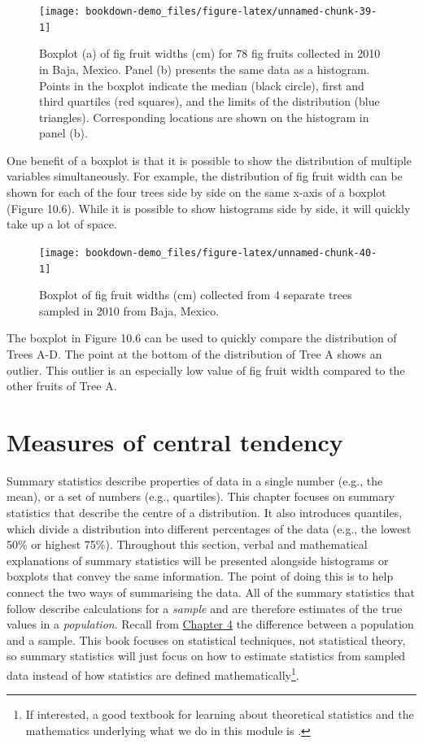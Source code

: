 \documentclass[
]{scrbook}
\begin{document}
\begin{figure}
\texttt{[image: bookdown-demo\_files/figure-latex/unnamed-chunk-39-1]} \caption{Boxplot (a) of fig fruit widths (cm) for 78 fig fruits collected in 2010 in Baja, Mexico. Panel (b) presents the same data as a histogram. Points in the boxplot indicate the median (black circle), first and third quartiles (red squares), and the limits of the distribution (blue triangles). Corresponding locations are shown on the histogram in panel (b).}\label{fig:unnamed-chunk-39}
\end{figure}

One benefit of a boxplot is that it is possible to show the distribution of multiple variables simultaneously.
For example, the distribution of fig fruit width can be shown for each of the four trees side by side on the same x-axis of a boxplot (Figure 10.6).
While it is possible to show histograms side by side, it will quickly take up a lot of space.

\begin{figure}
\texttt{[image: bookdown-demo\_files/figure-latex/unnamed-chunk-40-1]} \caption{Boxplot of fig fruit widths (cm) collected from 4 separate trees sampled in 2010 from Baja, Mexico.}\label{fig:unnamed-chunk-40}
\end{figure}

The boxplot in Figure 10.6 can be used to quickly compare the distribution of Trees A-D.
The point at the bottom of the distribution of Tree A shows an outlier.
This outlier is an especially low value of fig fruit width compared to the other fruits of Tree A.

\hypertarget{Chapter_11}{%
\chapter{Measures of central tendency}\label{Chapter_11}}

Summary statistics describe properties of data in a single number (e.g., the mean), or a set of numbers (e.g., quartiles).
This chapter focuses on summary statistics that describe the centre of a distribution.
It also introduces quantiles, which divide a distribution into different percentages of the data (e.g., the lowest 50\% or highest 75\%).
Throughout this section, verbal and mathematical explanations of summary statistics will be presented alongside histograms or boxplots that convey the same information.
The point of doing this is to help connect the two ways of summarising the data.
All of the summary statistics that follow describe calculations for a \emph{sample} and are therefore estimates of the true values in a \emph{population}.
Recall from \protect\hyperlink{Chapter_4}{Chapter 4} the difference between a population and a sample.
This book focuses on statistical techniques, not statistical theory, so summary statistics will just focus on how to estimate statistics from sampled data instead of how statistics are defined mathematically\footnote{If interested, a good textbook for learning about theoretical statistics and the mathematics underlying what we do in this module is \citet{Miller2004}.}.
\end{document}

